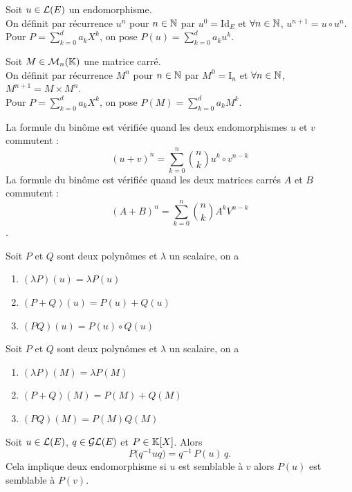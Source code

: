 \documentclass{book}
\begin{document}
\begin{Definition}
Soit $u\in  \mathcal{L}(E)$ un endomorphisme.\\
On définit par récurrence $u^n$ pour $n\in  \mathbb{N} $ par
$u^0 = \mathrm {Id}_{E}$ et $\forall   n\in  \mathbb{N} $, $u^{n+1} = u\circ u^n$.\\
Pour $P = \sum  _{k=0}^d a_k X^k$, on pose $P(u) = \sum  _{k=0}^d a_k u^k$.
\end{Definition}
\begin{Definition}
Soit $M\in  \mathcal{M}_{n}(\mathbb{K})$ une matrice carré.\\
On définit par récurrence $M^n$ pour $n\in  \mathbb{N} $ par
$M^0 = \mathrm {I}_{n}$ et $\forall   n\in  \mathbb{N} $, $M^{n+1} = M\times M^n$.\\
Pour $P = \sum  _{k=0}^d a_k X^k$, on pose $P(M) = \sum  _{k=0}^d a_k M^k$.
\end{Definition}
\begin{Proposition}
La formule du binôme est vérifiée quand les deux endomorphismes $u$ et $v$ commutent  :
$$(u+v)^{{n}}=\sum _{{k=0}}^{{n}}{{\binom  {n}{k}}u^{{k}}\circ v^{{n-k}}}$$
La formule du binôme est vérifiée quand les deux matrices carrés $A$ et $B$ commutent  :
$$(A+B)^{{n}}=\sum _{{k=0}}^{{n}}{{\binom  {n}{k}}A^{{k}} V^{{n-k}}}$$.
\end{Proposition}
\begin{Proposition}[Propriétés]
Soit $P$ et $Q$ sont deux polynômes et $\lambda $ un scalaire, on a
\begin{enumerate}
\item $(\lambda P)(u) = \lambda P(u)$
\item $(P+Q)(u) = P(u) + Q(u)$
\item $(PQ)(u) = P(u)\circ Q(u)$
\end{enumerate}
\end{Proposition}
\begin{Proposition}[Propriétés]
Soit $P$ et $Q$ sont deux polynômes et $\lambda $ un scalaire, on a
\begin{enumerate}
\item $(\lambda P)(M) = \lambda P(M)$
\item $(P+Q)(M) = P(M) + Q(M)$
\item $(PQ)(M) = P(M) Q(M)$
\end{enumerate}
\end{Proposition}
\begin{Proposition}[Conjugaison]
Soit $u\in  \mathcal{L}(E)$, $q\in  \mathcal{GL}(E)$ et $P\in  \mathbb{K} [X]$.
Alors
\[ P \bigl( q^{-1}uq \bigr) = q^{-1} \, P(u) \, q. \]
Cela implique deux endomorphisme si $u$ est semblable à $v$ alors $P(u)$ est semblable à $P(v)$.
\end{Proposition}
\end{document}
